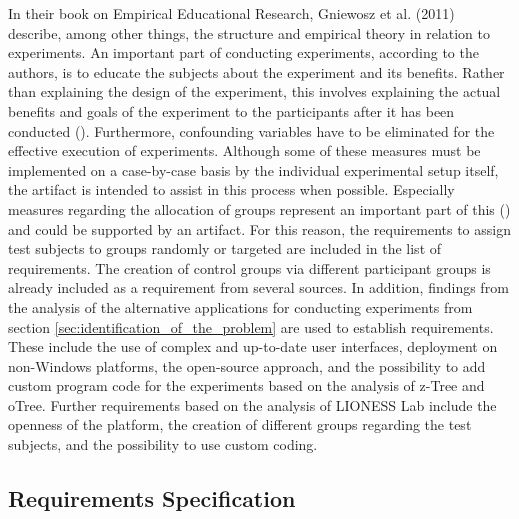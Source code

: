 In their book on Empirical Educational Research, Gniewosz et al. (2011) describe, among other things, the structure and empirical theory in relation to experiments. An important part of conducting experiments, according to the authors, is to educate the subjects about the experiment and its benefits. Rather than explaining the design of the experiment, this involves explaining the actual benefits and goals of the experiment to the participants after it has been conducted (\cite{Gniewosz.2011}). Furthermore, confounding variables have to be eliminated for the effective execution of experiments. Although some of these measures must be implemented on a case-by-case basis by the individual experimental setup itself, the artifact is intended to assist in this process when possible. Especially measures regarding the allocation of groups represent an important part of this (\cite{Gniewosz.2011}) and could be supported by an artifact. For this reason, the requirements to assign test subjects to groups randomly or targeted are included in the list of requirements. The creation of control groups via different participant groups is already included as a requirement from several sources. In addition, findings from the analysis of the alternative applications for conducting experiments from section \ref{sec:identification_of_the_problem} are used to establish requirements. These include the use of complex and up-to-date user interfaces, deployment on non-Windows platforms, the open-source approach, and the possibility to add custom program code for the experiments based on the analysis of z-Tree and oTree. Further requirements based on the analysis of LIONESS Lab include the openness of the platform, the creation of different groups regarding the test subjects, and the possibility to use custom coding.

\subsection{Requirements Specification}\label{subsec:reqSpec}

